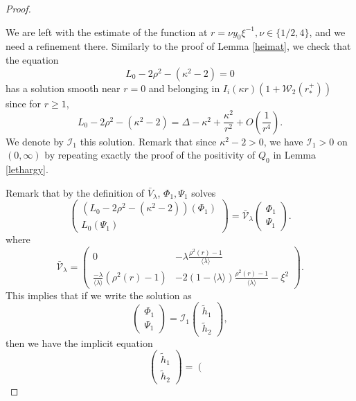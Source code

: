 \documentclass[10pt,a4paper]{amsart}
\begin{document}
\begin{proof}
  \
  
  We are left with the estimate of the function at $r = \nu y_0 \xi^{- 1}, \nu
  \in \{ 1/2, 4 \}$, and we need a refinement there.
  Similarly to the proof of Lemma \ref{heimat}, we check that the equation
  \[ L_0 - 2 \rho^2 - (\kappa^2 - 2) = 0 \]
  has a solution smooth near $r=0$ and belonging in $I_i (\kappa r) (1
  +\mathcal{W}_2 (r_\ast^+))$ since for $r \geqslant 1$,
  \[ L_0 - 2 \rho^2 - (\kappa^2 - 2) = \Delta - \kappa^2 +
     \frac{\kappa^2}{r^2} + O \left( \frac{1}{r^4} \right) . \]
  We denote by $\mathcal{I}_1$ this solution. Remark that since $\kappa^2-2>0$, we have $\mathcal{I}_1>0$ on $(0,\infty)$ by repeating exactly the proof of the positivity of $Q_0$ in Lemma \ref{lethargy}.
  
  Remark that by the definition of
  $\bar{V}_{\lambda}$, $\Phi_1, \Psi_1$ solves
  \[ \left(\begin{array}{c}
       (L_0 - 2 \rho^2 - (\kappa^2 - 2)) (\Phi_1)\\
       L_0 (\Psi_1)
     \end{array}\right) = \bar{\mathcal{V}}_{\lambda} \left(\begin{array}{c}
       \Phi_1\\
       \Psi_1
     \end{array}\right) . \]
  where
  \[ \bar{\mathcal{V}}_{\lambda} = \left(\begin{array}{cc}
       0 & - \lambda \frac{\rho^2 (r) - 1}{\langle \lambda \rangle}\\
       \frac{- \lambda}{\langle \lambda \rangle} (\rho^2 (r) - 1) & - 2 (1 -
       \langle \lambda \rangle) \frac{\rho^2 (r) - 1}{\langle \lambda \rangle}
       - \xi^2
     \end{array}\right) . \]
  This implies that if we write the solution as
  \[ \left(\begin{array}{c}
       \Phi_1\\
       \Psi_1
     \end{array}\right) =\mathcal{I}_1 \left(\begin{array}{c}
       \widetilde{h}_1\\
       \widetilde{h}_2
     \end{array}\right), \]
  then we have the implicit equation
  \[ \left(\begin{array}{c}
       \widetilde{h}_1\\
       \widetilde{h}_2
     \end{array}\right) = \left(\begin{array}{c}

\end{array}\]
\end{proof}
\end{document}

